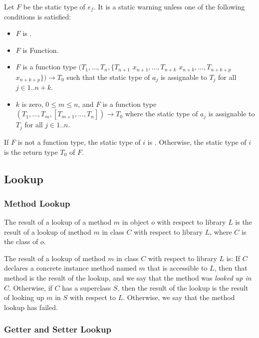 \documentclass{article}
\newcommand{\code}[1]{{\sf #1}}
\begin{document}
\LMHash{}
Let $F$ be the static type of $e_f$.
It is a static warning unless one of the following conditions is satisfied:
\begin{itemize}
\item $F$ is \DYNAMIC{}.
\item $F$ is \code{Function}.
\item $F$ is a function type
  $(T_1, \ldots, T_n,
  \{T_{n+1}$ $x_{n+1}, \ldots, T_{n+k}$ $x_{n+k}, \ldots, T_{n+k+p}$ $x_{n+k+p}\})
  \rightarrow T_0$
such that the static type of $a_j$ is assignable to $T_j$ for all
$j \in 1 .. n+k$.
\item $k$ is zero, $0 \leq m \leq n$, and $F$ is a function type
$(T_1, \ldots, T_m, [T_{m+1}, \ldots, T_n]) \rightarrow T_0$
where the static type of $a_j$ is assignable to $T_j$ for all $j \in 1 .. n$.
\end{itemize}
If $F$ is not a function type, the static type of $i$ is \DYNAMIC{}.
Otherwise, the static type of $i$ is the return type $T_0$ of $F$.


\subsection{ Lookup}

\subsubsection{Method Lookup}

\LMHash{}
The result of a lookup of a method $m$ in object $o$ with respect to library $L$ is the result of  a lookup of method $m$ in class $C$ with respect to library $L$, where $C$ is the class of $o$.

\LMHash{}
The result of  a lookup of method $m$ in class $C$ with respect to library $L$ is:
If $C$ declares a concrete instance method named $m$ that is accessible to $L$,  then that method is the result of the lookup, and we say that the method was {\em looked up in $C$}. Otherwise, if $C$ has a superclass $S$, then the result of the lookup is the result of looking up $m$  in $S$ with respect to $L$. Otherwise, we say that the method lookup has failed.



\subsubsection{ Getter and Setter Lookup}
\end{document}

